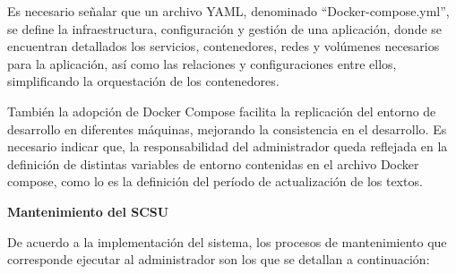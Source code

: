 \documentclass[
  12pt,
  openany]{book}
\begin{document}
Es necesario señalar que un archivo YAML, denominado ``Docker-compose.yml'', se define la infraestructura, configuración y gestión de una aplicación, donde se encuentran detallados los servicios, contenedores, redes y volúmenes necesarios para la aplicación, así como las relaciones y configuraciones entre ellos, simplificando la orquestación de los contenedores.

También la adopción de Docker Compose facilita la replicación del entorno de desarrollo en diferentes máquinas, mejorando la consistencia en el desarrollo. Es necesario indicar que, la responsabilidad del administrador queda reflejada en la definición de distintas variables de entorno contenidas en el archivo Docker compose, como lo es la definición del período de actualización de los textos.

\textbf{Mantenimiento del SCSU}

De acuerdo a la implementación del sistema, los procesos de mantenimiento que corresponde ejecutar al administrador son los que se detallan a continuación:
\end{document}
